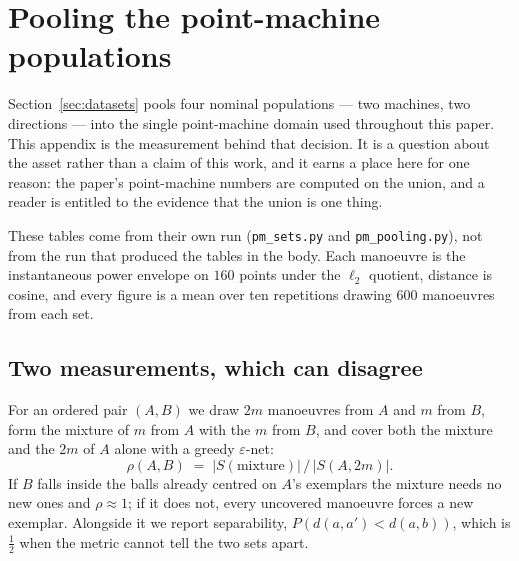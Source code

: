 \documentclass[10pt]{article}
\theoremstyle{plain}
\theoremstyle{definition}
\theoremstyle{remark}
\newcommand{\fitwidth}[1]{%
  \resizebox{\ifdim\width>\linewidth\linewidth\else\width\fi}{!}{#1}}
\begin{document}
\begin{table}[!htbp]\centering\small
\fitwidth{}
\caption{\small The three fiducials and the C5 diagnostic. $\varepsilon$ under
the pre-registered alignment (per-block \texttt{argmax}), under the corrected one
(template cross-correlation, two iterations, specified before running), and under
none. Bimodality is Sarle's coefficient on the position of the second high water
after alignment, in bold where it exceeds $5/9$. The pre-registered criterion was
$\rho \le -0.6$ on the coefficient, not on a $p$-value.}
\label{tab:fiducial}
\end{table}

\section{Pooling the point-machine populations}
\label{app:pm-pooling}

Section~\ref{sec:datasets} pools four nominal populations --- two machines, two
directions --- into the single point-machine domain used throughout this paper.
This appendix is the measurement behind that decision. It is a question about
the asset rather than a claim of this work, and it earns a place here for one
reason: the paper's point-machine numbers are computed on the union, and a
reader is entitled to the evidence that the union is one thing.

These tables come from their own run (\texttt{pm\_sets.py} and
\texttt{pm\_pooling.py}), not from the run that produced the tables in the
body. Each manoeuvre is the instantaneous power envelope on $160$ points under
the $\ell_2$ quotient, distance is cosine, and every figure is a mean over ten
repetitions drawing $600$ manoeuvres from each set.

\subsection*{Two measurements, which can disagree}

For an ordered pair $(A,B)$ we draw $2m$ manoeuvres from $A$ and $m$ from $B$,
form the mixture of $m$ from $A$ with the $m$ from $B$, and cover both the
mixture and the $2m$ of $A$ alone with a greedy $\varepsilon$-net:
\[
  \rho(A,B) \;=\; |S(\text{mixture})| \,/\, |S(A, 2m)| .
\]
If $B$ falls inside the balls already centred on $A$'s exemplars the mixture
needs no new ones and $\rho \approx 1$; if it does not, every uncovered
manoeuvre forces a new exemplar. Alongside it we report separability,
$P\!\left(d(a,a') < d(a,b)\right)$, which is $\tfrac12$ when the metric cannot
tell the two sets apart.
\end{document}
